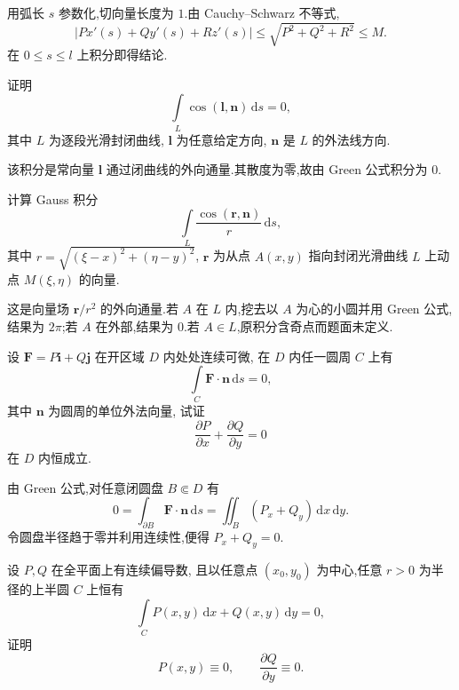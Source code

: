 \begin{solution}
    用弧长 $s$ 参数化,切向量长度为 $1$.由 Cauchy--Schwarz 不等式,
    \[
        |P x'(s)+Q y'(s)+R z'(s)|\leq\sqrt{P^2+Q^2+R^2}\leq M.
    \]
    在 $0\leq s\leq l$ 上积分即得结论.
\end{solution}

\begin{example}
    证明
    \[
        \displaystyle\int\limits_L\cos(\bm l,\bm n)\,\mathrm{d}s=0,
    \]
    其中 $L$ 为逐段光滑封闭曲线, $\bm l$ 为任意给定方向, $\bm n$ 是 $L$ 的外法线方向.
\end{example}
\exampleblank

\begin{solution}
    该积分是常向量 $\bm l$ 通过闭曲线的外向通量.其散度为零,故由 Green 公式积分为 $0$.
\end{solution}

\begin{example}
    计算 Gauss 积分
    \[
        \displaystyle\int\limits_L\dfrac{\cos(\bm r,\bm n)}{r}\,\mathrm{d}s,
    \]
    其中 $r=\sqrt{(\xi-x)^2+(\eta-y)^2}$, $\bm r$ 为从点 $A(x,y)$ 指向封闭光滑曲线 $L$ 上动点 $M(\xi,\eta)$ 的向量.
\end{example}
\exampleblank

\begin{solution}
    这是向量场 $\bm r/r^2$ 的外向通量.若 $A$ 在 $L$ 内,挖去以 $A$ 为心的小圆并用 Green 公式,结果为 $2\pi$;若 $A$ 在外部,结果为 $0$.若 $A\in L$,原积分含奇点而题面未定义.
\end{solution}

\begin{example}[\markstar]
    设 $\bm F=P\bm i+Q\bm j$ 在开区域 $D$ 内处处连续可微, 在 $D$ 内任一圆周 $C$ 上有
    \[
        \displaystyle\int\limits_C\bm F\cdot\bm n\,\mathrm{d}s=0,
    \]
    其中 $\bm n$ 为圆周的单位外法向量, 试证
    \[
        \dfrac{\partial P}{\partial x}+\dfrac{\partial Q}{\partial y}=0
    \]
    在 $D$ 内恒成立.
\end{example}
\exampleblank

\begin{solution}
    由 Green 公式,对任意闭圆盘 $B\Subset D$ 有
    \[
        0=\int_{\partial B}\bm F\cdot\bm n\,\mathrm{d}s
        =\iint_B(P_x+Q_y)\,\mathrm{d}x\,\mathrm{d}y.
    \]
    令圆盘半径趋于零并利用连续性,便得 $P_x+Q_y=0$.
\end{solution}

\begin{example}[\markstar]
    设 $P,Q$ 在全平面上有连续偏导数, 且以任意点 $(x_0,y_0)$ 为中心,任意 $r>0$ 为半径的上半圆 $C$ 上恒有
    \[
        \displaystyle\int\limits_C P(x,y)\,\mathrm{d}x+Q(x,y)\,\mathrm{d}y=0,
    \]
    证明
    \[
        P(x,y)\equiv0,
        \qquad
        \dfrac{\partial Q}{\partial y}\equiv0.
    \]
\end{example}
\exampleblank

